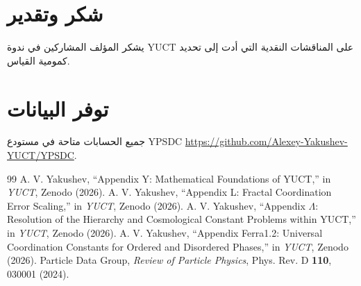 \documentclass[12pt,a4paper]{article}
\begin{document}
	\section*{شكر وتقدير}
	يشكر المؤلف المشاركين في ندوة YUCT على المناقشات النقدية التي أدت إلى تحديد كمومية القياس.
	
	\section*{توفر البيانات}
	جميع الحسابات متاحة في مستودع YPSDC \url{https://github.com/Alexey-Yakushev-YUCT/YPSDC}.
	
	\begin{thebibliography}{99}
		 A. V. Yakushev, ``Appendix Y: Mathematical Foundations of YUCT,'' in \emph{YUCT}, Zenodo (2026).
		 A. V. Yakushev, ``Appendix L: Fractal Coordination Error Scaling,'' in \emph{YUCT}, Zenodo (2026).
		 A. V. Yakushev, ``Appendix \(\Lambda\): Resolution of the Hierarchy and Cosmological Constant Problems within YUCT,'' in \emph{YUCT}, Zenodo (2026).
		 A. V. Yakushev, ``Appendix Ferra1.2: Universal Coordination Constants for Ordered and Disordered Phases,'' in \emph{YUCT}, Zenodo (2026).
		 Particle Data Group, \emph{Review of Particle Physics}, Phys. Rev. D \textbf{110}, 030001 (2024).
	\end{thebibliography}
	
\end{document}
